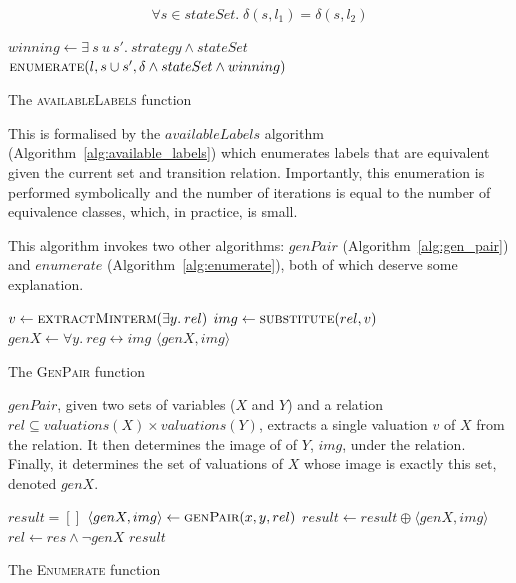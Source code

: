 \begin{equation}
    \forall s \in stateSet. \; \delta(s, l_1) = \delta(s, l_2)
\end{equation}

\begin{algorithm}
\begin{algorithmic}

    \State $winning \gets \exists \: s \: u \: s'. \: strategy \land stateSet$
    \State\Return$\Call{enumerate}{l, s \cup s', \delta \land stateSet \land winning}$
\EndFunction

\end{algorithmic}
\caption{The \textsc{availableLabels} function}
\label{alg:available_labels}
\end{algorithm}

This is formalised by the $availableLabels$ algorithm (Algorithm~\ref{alg:available_labels}) which enumerates labels that are equivalent given the current set and transition relation. Importantly, this enumeration is performed symbolically and the number of iterations is equal to the number of equivalence classes, which, in practice, is small.

This algorithm invokes two other algorithms: $genPair$ (Algorithm~\ref{alg:gen_pair}) and $enumerate$ (Algorithm~\ref{alg:enumerate}), both of which deserve some explanation. 

\begin{algorithm}
\begin{algorithmic}

    \State $v \gets \Call{extractMinterm}{\exists y. \: rel}$
    \State $img      \gets \Call{substitute}{rel, v}$
    \State $genX     \gets \forall y. \: reg \leftrightarrow img$
    \State\Return $\langle genX, img \rangle$
\EndFunction

\end{algorithmic}
\caption{The \textsc{GenPair} function}
\label{alg:gen_pair}
\end{algorithm}

$genPair$, given two sets of variables ($X$ and $Y$) and a relation $rel \subseteq valuations(X) \times valuations (Y)$, extracts a single valuation $v$ of $X$ from the relation. It then determines the image of of $Y$, $img$, under the relation. Finally, it determines the set of valuations of $X$ whose image is exactly this set, denoted $genX$. 

\begin{algorithm}
\begin{algorithmic}

    \State $result = []$
        \State $\langle genX, img \rangle \gets \Call{genPair}{x, y, rel}$
        \State $result \gets result \oplus \langle genX, img \rangle$
        \State $rel \gets res \land \neg genX$
    \EndWhile
    \State\Return $result$
\EndFunction

\end{algorithmic}
\caption{The \textsc{Enumerate} function}
\label{alg:enumerate}
\end{algorithm}

